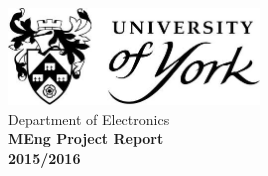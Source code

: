 \begin{titlepage}
		
		
		
		
		
		
		
	
	

		
		

	\begin{center}
		\null
		\vspace{0.5cm}
		\includegraphics[width = 0.5\textwidth]{Presections/FrontCover/title.png}\\
		\vspace{0.2cm}
		\huge
		Department of Electronics\\
		\vspace{2cm}
		\Huge
		\textbf{MEng Project Report}\\
		\vspace{1cm}
		\textbf{2015/2016}
	\end{center}
	

\end{titlepage}
